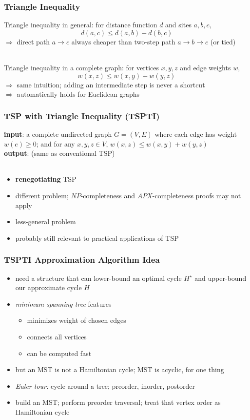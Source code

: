 \documentclass[10pt,aspectratio=169]{beamer}
\newcommand{\stanza}{ \\~\ }
\begin{document}
  \begin{frame} \frametitle{Triangle Inequality}
  Triangle inequality in general: for distance function $d$ and sites $a, b, c,$
  \[ d(a, c) \leq d(a, b) + d(b, c) \]
  $\Rightarrow$ direct path $a \rightarrow c$ always cheaper than two-step path
  $a \rightarrow b \rightarrow c$ (or tied) \stanza
  
  Triangle inequality in a complete graph: for vertices $x, y, z$ and edge weights $w,$
  \[ w(x, z) \leq w(x, y) + w(y, z) \]
  $\Rightarrow$ same intuition; adding an intermediate step is never a shortcut \\
  $\Rightarrow$ automatically holds for Euclidean graphs
  \end{frame}
  
  \begin{frame} \frametitle{TSP with Triangle Inequality (TSPTI)}
  
  \textbf{input}: a complete undirected graph $G=(V,E)$ where each edge has weight $w(e) \geq 0$;
  and for any $x, y, z \in V$, $w(x, z) \leq w(x, y) + w(y, z)$ \\
  \textbf{output}: (same as conventional TSP) \stanza
  \begin{itemize}
    \item \textbf{renegotiating} TSP
    \item different problem; $NP$-completeness and $APX$-completeness proofs may not apply
    \item less-general problem
    \item probably still relevant to practical applications of TSP
  \end{itemize}
  \end{frame}
  
  \begin{frame} \frametitle{TSPTI Approximation Algorithm Idea}
  \begin{itemize}
    \item need a structure that can lower-bound an optimal cycle $H^\star$ and upper-bound
      our approximate cycle $H$
    \item \emph{minimum spanning tree} features
    \begin{itemize}
      \item minimizes weight of chosen edges
      \item connects all vertices
      \item can be computed fast
    \end{itemize}
    \item but an MST is not a Hamiltonian cycle; MST is acyclic, for one thing
    \item \emph{Euler tour:} cycle around a tree; preorder, inorder, postorder
    \item build an MST; perform preorder traversal; treat that vertex order as Hamiltonian cycle
  \end{itemize}
  \end{frame}
  
\end{document}
